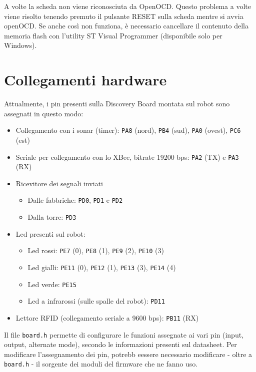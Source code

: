 \begin{nota} A volte la scheda non viene riconosciuta da OpenOCD. Questo problema a volte viene risolto tenendo premuto il pulsante RESET sulla scheda mentre si avvia openOCD. Se anche così non funziona, è necessario cancellare il contenuto della memoria flash con l'utility ST Visual Programmer (disponibile solo per Windows).
\end{nota}

\section{Collegamenti hardware}
Attualmente, i pin presenti sulla Discovery Board montata sul robot sono assegnati in questo modo:
\begin{itemize}
\item Collegamento con i sonar (timer): \verb|PA8| (nord), \verb|PB4| (sud), \verb|PA0| (ovest), \verb|PC6| (est)
\item Seriale per collegamento con lo XBee, bitrate 19200 bps: \verb|PA2| (TX) e \verb|PA3| (RX)
\item Ricevitore dei segnali inviati
	\begin{itemize}
	\item Dalle fabbriche: \verb|PD0|, \verb|PD1| e \verb|PD2|
	\item Dalla torre: \verb|PD3|
	\end{itemize}
\item Led presenti sul robot:
	\begin{itemize}
	\item Led rossi: \verb|PE7| (0), \verb|PE8| (1), \verb|PE9| (2), \verb|PE10| (3)
	\item Led gialli: \verb|PE11| (0), \verb|PE12| (1), \verb|PE13| (3), \verb|PE14| (4)
	\item Led verde: \verb|PE15|
	\item Led a infrarossi (sulle spalle del robot): \verb|PD11|
	\end{itemize}
\item Lettore RFID (collegamento seriale a 9600 bps): \verb|PB11| (RX)
\end{itemize}
\begin{nota}
Il file \verb|board.h| permette di configurare le funzioni assegnate ai vari pin (input, output, alternate mode), secondo le informazioni presenti sul datasheet. Per modificare l'assegnamento dei pin, potrebb eessere necessario modificare - oltre a \verb|board.h| - il sorgente dei moduli del firmware che ne fanno uso.
\end{nota}


